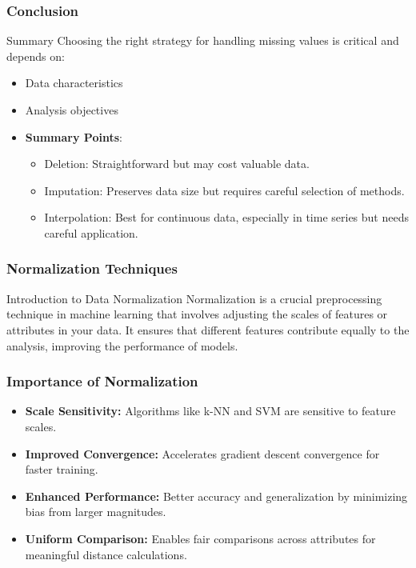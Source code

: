 \documentclass[aspectratio=169]{beamer}
\begin{document}
\begin{frame}[fragile]
    \frametitle{Conclusion}
    \begin{block}{Summary}
        Choosing the right strategy for handling missing values is critical and depends on:
    \end{block}
    \begin{itemize}
        \item Data characteristics
        \item Analysis objectives
    \end{itemize}
    \begin{itemize}
        \item \textbf{Summary Points}:
        \begin{itemize}
            \item Deletion: Straightforward but may cost valuable data.
            \item Imputation: Preserves data size but requires careful selection of methods.
            \item Interpolation: Best for continuous data, especially in time series but needs careful application.
        \end{itemize}
    \end{itemize}
\end{frame}

\begin{frame}[fragile]
    \frametitle{Normalization Techniques}
    \begin{block}{Introduction to Data Normalization}
        Normalization is a crucial preprocessing technique in machine learning that involves adjusting the scales of features or attributes in your data. It ensures that different features contribute equally to the analysis, improving the performance of models.
    \end{block}
\end{frame}

\begin{frame}[fragile]
    \frametitle{Importance of Normalization}
    \begin{itemize}
        \item \textbf{Scale Sensitivity:} Algorithms like k-NN and SVM are sensitive to feature scales.
        \item \textbf{Improved Convergence:} Accelerates gradient descent convergence for faster training.
        \item \textbf{Enhanced Performance:} Better accuracy and generalization by minimizing bias from larger magnitudes.
        \item \textbf{Uniform Comparison:} Enables fair comparisons across attributes for meaningful distance calculations.
    \end{itemize}
\end{frame}
\end{document}
